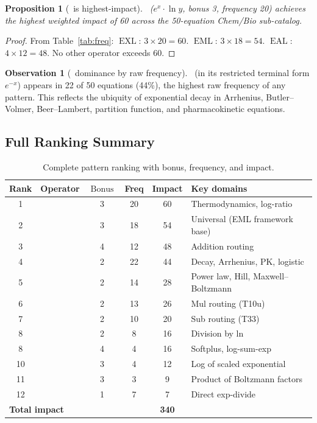 \documentclass[12pt,a4paper]{article}
\newtheorem{proposition}[theorem]{Proposition}
\theoremstyle{definition}
\newtheorem{observation}[theorem]{Observation}
\newcommand{\EML}{\operatorname{EML}}
\newcommand{\EDL}{\operatorname{EDL}}
\newcommand{\EXL}{\operatorname{EXL}}
\newcommand{\EAL}{\operatorname{EAL}}
\newcommand{\EMN}{\operatorname{EMN}}
\newcommand{\DEML}{\operatorname{DEML}}
\newcommand{\ELAd}{\operatorname{ELAd}}
\newcommand{\ELSb}{\operatorname{ELSb}}
\newcommand{\LEAd}{\operatorname{LEAd}}
\newcommand{\LEdiv}{\operatorname{LEdiv}}
\newcommand{\LEprod}{\operatorname{LEprod}}
\newcommand{\EPL}{\operatorname{EPL}}
\newcommand{\Bonus}{\operatorname{Bonus}}
\begin{document}
\begin{proposition}[\EXL\ is highest-impact]
\label{prop:exl-top}
\EXL\ ($e^x \cdot \ln y$, bonus 3, frequency 20) achieves the highest
weighted impact of 60 across the 50-equation Chem/Bio sub-catalog.
\end{proposition}

\begin{proof}
From Table~\ref{tab:freq}: $\EXL$: $3 \times 20 = 60$.
$\EML$: $3 \times 18 = 54$.
$\EAL$: $4 \times 12 = 48$.
No other operator exceeds 60.
\end{proof}

\begin{observation}[\DEML\ dominance by raw frequency]
\label{obs:deml}
\DEML\ (in its restricted terminal form $e^{-x}$) appears in 22 of
50 equations (44\%), the highest raw frequency of any pattern.
This reflects the ubiquity of exponential decay in Arrhenius,
Butler--Volmer, Beer--Lambert, partition function, and pharmacokinetic
equations.
\end{observation}

\subsection{Full Ranking Summary}

\begin{table}[h]
\centering
\caption{Complete pattern ranking with bonus, frequency, and impact.}
\label{tab:ranking}
\smallskip
\begin{tabular}{@{}clcccl@{}}
\toprule
\textbf{Rank} & \textbf{Operator} & $\Bonus$ & \textbf{Freq} &
\textbf{Impact} & \textbf{Key domains} \\
\midrule
 1 & \EXL    & 3 & 20 & 60 & Thermodynamics, log-ratio \\
 2 & \EML    & 3 & 18 & 54 & Universal (EML framework base) \\
 3 & \EAL    & 4 & 12 & 48 & Addition routing \\
 4 & \DEML   & 2 & 22 & 44 & Decay, Arrhenius, PK, logistic \\
 5 & \EPL    & 2 & 14 & 28 & Power law, Hill, Maxwell--Boltzmann \\
 6 & \ELAd   & 2 & 13 & 26 & Mul routing (T10u) \\
 7 & \LEdiv  & 2 & 10 & 20 & Sub routing (T33) \\
 8 & \EDL    & 2 &  8 & 16 & Division by ln \\
 8 & \LEAd   & 4 &  4 & 16 & Softplus, log-sum-exp \\
10 & \LEprod & 3 &  4 & 12 & Log of scaled exponential \\
11 & \EMN    & 3 &  3 &  9 & Product of Boltzmann factors \\
12 & \ELSb   & 1 &  7 &  7 & Direct exp-divide \\
\midrule
\multicolumn{3}{l}{\textbf{Total impact}} & & \textbf{340} & \\
\bottomrule
\end{tabular}
\end{table}
\end{document}
